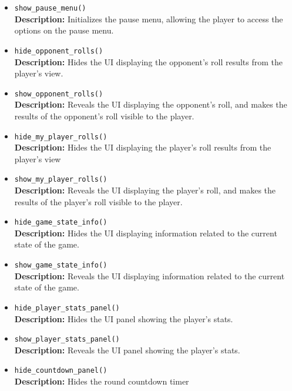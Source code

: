 \documentclass[12pt, titlepage]{article}
\begin{document}
\begin{itemize}
	\item \texttt{show\_pause\_menu() }\\
	\textbf{Description:} Initializes the pause menu, allowing the player to access the options on the pause menu.
	
	\item \texttt{hide\_opponent\_rolls() }\\
	\textbf{Description:} Hides the UI displaying the opponent's roll results from the player's view.
	
	\item \texttt{show\_opponent\_rolls() }\\
	\textbf{Description:} Reveals the UI displaying the opponent's roll, and makes the results of the opponent's roll visible to the player.
	
	\item \texttt{hide\_my\_player\_rolls() }\\
	\textbf{Description:} Hides the UI displaying the player's roll results from the player's view
	
	\item \texttt{show\_my\_player\_rolls() }\\
	\textbf{Description:} Reveals the UI displaying the player's roll, and makes the results of the player's roll visible to the player.
	
	\item \texttt{hide\_game\_state\_info() }\\
	\textbf{Description:} Hides the UI displaying information related to the current state of the game.
	
	\item \texttt{show\_game\_state\_info() }\\
	\textbf{Description:} Reveals the UI displaying information related to the current state of the game.
	
	\item \texttt{hide\_player\_stats\_panel() }\\
	\textbf{Description:} Hides the UI panel showing the player's stats.
	
	\item \texttt{show\_player\_stats\_panel() }\\
	\textbf{Description:} Reveals the UI panel showing the player's stats.
	
	\item \texttt{hide\_countdown\_panel() }\\
	\textbf{Description:} Hides the round countdown timer
	

\end{itemize}
\end{document}
